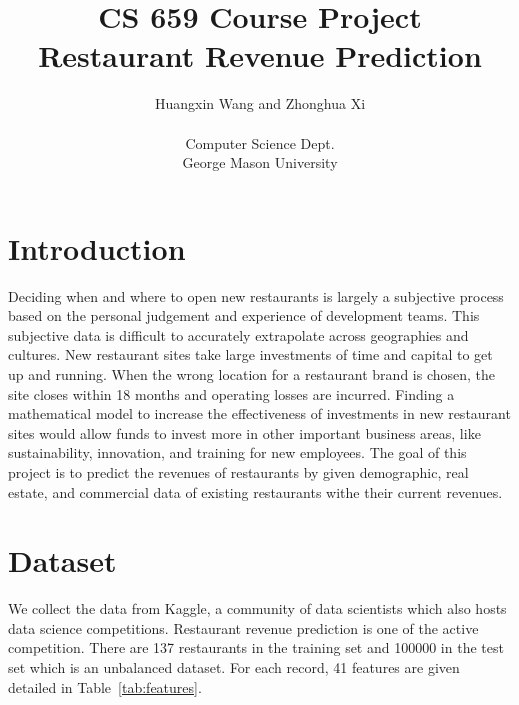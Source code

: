 \documentclass[11pt, oneside]{article}   	%
\title{CS 659 Course Project \\ Restaurant Revenue Prediction}
\author{Huangxin Wang and Zhonghua Xi \\
\\
Computer Science Dept. \\
George Mason University}
\newcommand\tabref{Table~\ref}
\begin{document}
\maketitle

\section{Introduction}
Deciding when and where to open new restaurants is largely a subjective process based on the personal judgement and experience of development teams. 
This subjective data is difficult to accurately extrapolate across geographies and cultures.
New restaurant sites take large investments of time and capital to get up and running. 
When the wrong location for a restaurant brand is chosen, the site closes within 18 months and operating losses are incurred. 
Finding a mathematical model to increase the effectiveness of investments in new restaurant sites would allow funds to invest more in other important business areas, like sustainability, innovation, and training for new employees.
The goal of this project is to predict the revenues of restaurants by given demographic, real estate, and commercial data of existing restaurants withe their current revenues.

\section{Dataset}
We collect the data from Kaggle, a community of data scientists which also hosts data science competitions. 
Restaurant revenue prediction is one of the active competition.
There are 137 restaurants in the training set and 100000 in the test set which is an unbalanced dataset. 
For each record, 41 features are given detailed in \tabref{tab:features}.
\end{document}
